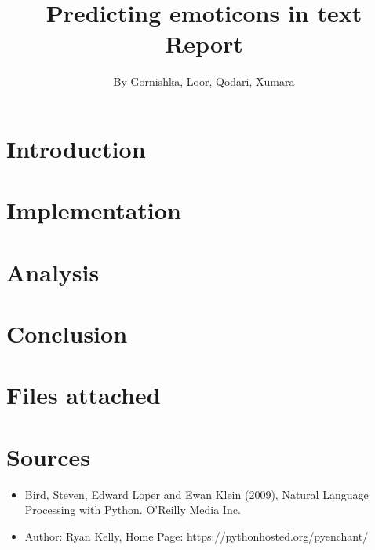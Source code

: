 \documentclass{article}
\begin{document}
\title{Predicting emoticons in text \\ Report}

\author{By Gornishka, Loor, Qodari, Xumara}
\maketitle

\tableofcontents

\pagebreak

\section*{Introduction}

\section*{Implementation}

\section*{Analysis}

\section*{Conclusion}

\section*{Files attached}

\section*{Sources}
\begin{itemize}
	\item Bird, Steven, Edward Loper and Ewan Klein (2009), Natural Language Processing with Python. O’Reilly Media Inc.
	\item Author: Ryan Kelly, Home Page: https://pythonhosted.org/pyenchant/
\end{itemize}
\end{document}

